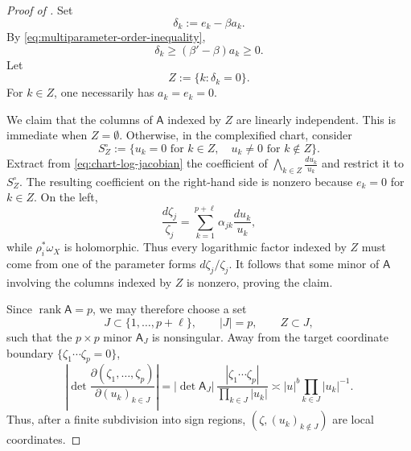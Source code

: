 \documentclass[reqno,11pt]{amsart}
\numberwithin{equation}{section}
\theoremstyle{definition}
\theoremstyle{remark}
\begin{document}
\begin{proof}[Proof of ]
Set
\begin{equation}\label{eq:delta-positive}
\delta_k:=e_k-\beta a_k.
\end{equation}
By \eqref{eq:multiparameter-order-inequality},
$$
\delta_k
\ge
(\beta'-\beta)a_k
\ge0.
$$
Let
$$
Z:=\{k:\delta_k=0\}.
$$
For $k\in Z$, one necessarily has $a_k=e_k=0$.

We claim that the columns of $\mathsf A$ indexed by $Z$ are linearly
independent. This is immediate when $Z=\emptyset$. Otherwise, in the
complexified chart, consider
$$
S_Z^\circ
:=
\{u_k=0\text{ for }k\in Z,\quad
  u_k\ne0\text{ for }k\notin Z\}.
$$
Extract from \eqref{eq:chart-log-jacobian} the coefficient of
$\bigwedge_{k\in Z}\frac{du_k}{u_k}$
and restrict it to $S_Z^\circ$. The resulting coefficient on the
right-hand side is nonzero because $e_k=0$ for $k\in Z$. On the left,
$$
\frac{d\zeta_j}{\zeta_j}
=
\sum_{k=1}^{p+\ell}
\alpha_{jk}\frac{du_k}{u_k},
$$
while $\rho_i^*\omega_X$ is holomorphic. Thus every logarithmic factor
indexed by $Z$ must come from one of the parameter forms
$d\zeta_j/\zeta_j$. It follows that some minor of $\mathsf A$ involving
the columns indexed by $Z$ is nonzero, proving the claim.

Since $\operatorname{rank}\mathsf A=p$, we may therefore choose a set
$$
J\subset\{1,\ldots,p+\ell\},
\qquad
|J|=p,
\qquad
Z\subset J,
$$
such that the $p\times p$ minor $\mathsf A_J$ is nonsingular. Away from the
target coordinate boundary $\{\zeta_1\cdots\zeta_p=0\}$,
\begin{equation}\label{eq:parameter-jacobian-normal-form}
\left|
\det
\frac{\partial(\zeta_1,\ldots,\zeta_p)}
     {\partial(u_k)_{k\in J}}
\right|
=
|\det\mathsf A_J|\,
\frac{|\zeta_1\cdots\zeta_p|}
     {\prod_{k\in J}|u_k|}
\asymp
|u|^b\prod_{k\in J}|u_k|^{-1}.
\end{equation}
Thus, after a finite subdivision into sign regions,
$(\zeta,(u_k)_{k\notin J})$ are local coordinates.


\end{proof}
\end{document}
